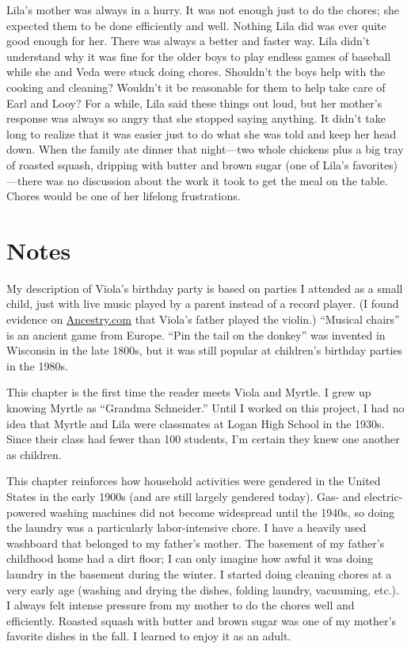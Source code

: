\documentclass[
  letterpaper,
]{book}
\begin{document}
Lila's mother was always in a hurry. It was not enough just to do the
chores; she expected them to be done efficiently and well. Nothing Lila
did was ever quite good enough for her. There was always a better and
faster way. Lila didn't understand why it was fine for the older boys to
play endless games of baseball while she and Veda were stuck doing
chores. Shouldn't the boys help with the cooking and cleaning? Wouldn't
it be reasonable for them to help take care of Earl and Looy? For a
while, Lila said these things out loud, but her mother's response was
always so angry that she stopped saying anything. It didn't take long to
realize that it was easier just to do what she was told and keep her
head down. When the family ate dinner that night---two whole chickens
plus a big tray of roasted squash, dripping with butter and brown sugar
(one of Lila's favorites)---there was no discussion about the work it
took to get the meal on the table. Chores would be one of her lifelong
frustrations.

\section{Notes}\label{notes-8}

My description of Viola's birthday party is based on parties I attended
as a small child, just with live music played by a parent instead of a
record player. (I found evidence on
\href{https://www.ancestry.com/}{Ancestry.com} that Viola's father
played the violin.) ``Musical chairs'' is an ancient game from Europe.
``Pin the tail on the donkey'' was invented in Wisconsin in the late
1800s, but it was still popular at children's birthday parties in the
1980s.

This chapter is the first time the reader meets Viola and Myrtle. I grew
up knowing Myrtle as ``Grandma Schneider.'' Until I worked on this
project, I had no idea that Myrtle and Lila were classmates at Logan
High School in the 1930s. Since their class had fewer than 100 students,
I'm certain they knew one another as children.

This chapter reinforces how household activities were gendered in the
United States in the early 1900s (and are still largely gendered today).
Gas- and electric-powered washing machines did not become widespread
until the 1940s, so doing the laundry was a particularly labor-intensive
chore. I have a heavily used washboard that belonged to my father's
mother. The basement of my father's childhood home had a dirt floor; I
can only imagine how awful it was doing laundry in the basement during
the winter. I started doing cleaning chores at a very early age (washing
and drying the dishes, folding laundry, vacuuming, etc.). I always felt
intense pressure from my mother to do the chores well and efficiently.
Roasted squash with butter and brown sugar was one of my mother's
favorite dishes in the fall. I learned to enjoy it as an adult.
\end{document}
